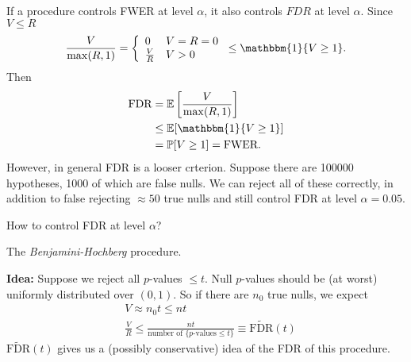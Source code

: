 \documentclass[a4paper]{article}
\begin{document}
\begin{remark}
	If a procedure controls FWER at level $\alpha$, it also controls $FDR$ at level $\alpha$. Since $V \leq R$
	\begin{equation*}
		\frac{V}{\max(R,1)} = \left\{ \begin{array}{ll}
			0 & V=R=0 \\
			\frac{V}{R} & V > 0
		\end{array} \right. \leq \mathbbm{1}\{V \geq 1\}.
	\end{equation*}
	Then
	\begin{equation}
		\begin{aligned}
			\text{FDR} &= \mathbb{E}\left[\frac{V}{\max(R,1)}\right] \\
			&\leq \mathbb{E}[\mathbbm{1}\{V \geq 1\}] \\
			&= \mathbb{P}[V \geq 1] = \text{FWER}.
		\end{aligned}
	\end{equation}
	However, in general FDR is a looser crterion. Suppose there are 100000 hypotheses, 1000 of which are false nulls. We can reject all of these correctly, in addition to false rejecting $\approx 50$ true nulls and still control FDR at level $\alpha = 0.05$.
\end{remark}

\begin{question}
	How to control FDR at level $\alpha$?
\end{question}

\begin{answer}
	The \emph{Benjamini-Hochberg} procedure.
\end{answer}

\noindent \textbf{Idea:} Suppose we reject all $p$-values $\leq t$. Null $p$-values should be (at worst) uniformly distributed over $(0,1)$. So if there are $n_0$ true nulls, we expect
\begin{equation*}
	\begin{aligned}
		& V \approx n_0t \leq nt \\
		& \frac{V}{R} \leq \frac{nt}{\text{number of } \{p\text{-values} \leq t\}} \equiv \tilde{\text{FDR}}(t)
	\end{aligned}
\end{equation*}
$\tilde{\text{FDR}}(t)$ gives us a (possibly conservative) idea of the FDR of this procedure.\\
\end{document}
